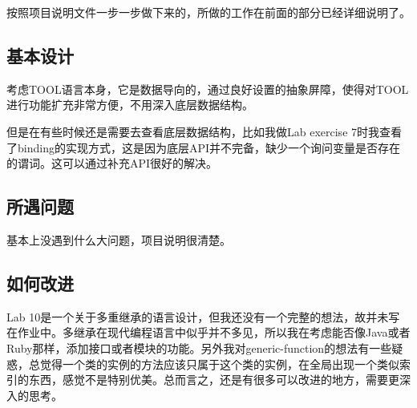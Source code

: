 \documentclass[a4paper]{article}
\begin{document}
按照项目说明文件一步一步做下来的，所做的工作在前面的部分已经详细说明了。

\subsection{基本设计}

考虑TOOL语言本身，它是数据导向的，通过良好设置的抽象屏障，使得对TOOL进行功能扩充非常方便，不用深入底层数据结构。

但是在有些时候还是需要去查看底层数据结构，比如我做Lab exercise 7时我查看了binding的实现方式，这是因为底层API并不完备，缺少一个询问变量是否存在的谓词。这可以通过补充API很好的解决。

\subsection{所遇问题}

基本上没遇到什么大问题，项目说明很清楚。

\subsection{如何改进}

Lab 10是一个关于多重继承的语言设计，但我还没有一个完整的想法，故并未写在作业中。多继承在现代编程语言中似乎并不多见，所以我在考虑能否像Java或者Ruby那样，添加接口或者模块的功能。另外我对generic-function的想法有一些疑惑，总觉得一个类的实例的方法应该只属于这个类的实例，在全局出现一个类似索引的东西，感觉不是特别优美。总而言之，还是有很多可以改进的地方，需要更深入的思考。
\end{document}
